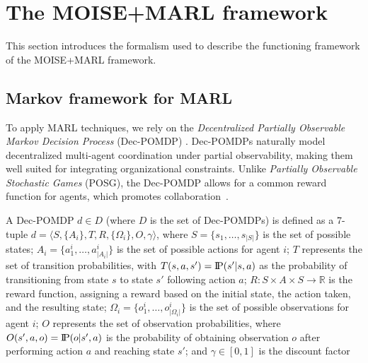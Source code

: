 \documentclass[sigconf]{aamas}
\newcommand{\probP}{\text{I\kern-0.15em P}}
\begin{document}
\section{The MOISE+MARL framework}
\label{sec:moise_marl_framework}

This section introduces the formalism used to describe the functioning framework of the MOISE+MARL framework.

\subsection{Markov framework for MARL}

To apply MARL techniques, we rely on the \textit{Decentralized Partially Observable Markov Decision Process} (Dec-POMDP) \cite{Oliehoek2016}. Dec-POMDPs naturally model decentralized multi-agent coordination under partial observability, making them well suited for integrating organizational constraints. Unlike \textit{Partially Observable Stochastic Games} (POSG), the Dec-POMDP allows for a common reward function for agents, which promotes collaboration~\cite{Beynier2013}.

A Dec-POMDP $d \in D$ (where $D$ is the set of Dec-POMDPs) is defined as a 7-tuple $d = \langle S, \{A_i\}, T, R, \{\Omega_i\}, O, \gamma \rangle$, where $S = \{s_1,\dots,s_{|S|}\}$ is the set of possible states; $A_{i} = \{a_{1}^{i},\dots,a_{|A_{i}|}^{i}\}$ is the set of possible actions for agent $i$; $T$ represents the set of transition probabilities, with $T(s,a,s') = \probP(s'|s,a)$ as the probability of transitioning from state $s$ to state $s'$ following action $a$; $R: S \times A \times S \rightarrow \mathbb{R}$ is the reward function, assigning a reward based on the initial state, the action taken, and the resulting state; $\Omega_{i} = \{o_{1}^{i},\dots,o_{|\Omega_{i}|}^{i}\}$ is the set of possible observations for agent $i$; $O$ represents the set of observation probabilities, where $O(s',a,o) = \probP(o|s',a)$ is the probability of obtaining observation $o$ after performing action $a$ and reaching state $s'$; and $\gamma \in [0,1]$ is the discount factor
\end{document}
